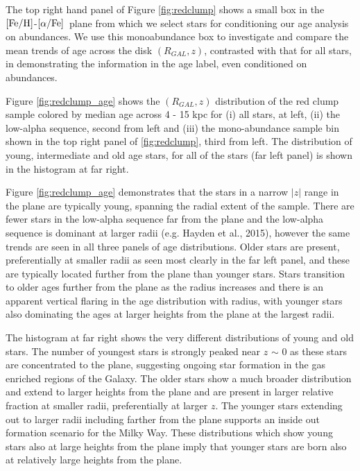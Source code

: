 \documentclass[12pt, preprint]{aastex}
\newcommand{\feh}{\mbox{$\rm [Fe/H]$}}
\newcommand{\alphafe}{\mbox{$\rm [\alpha/Fe]$}}
\begin{document}
The top right hand panel of Figure \ref{fig:redclump} shows a small box in the \feh-\alphafe\ plane from which we select stars for conditioning our age analysis on abundances. We use this monoabundance box to investigate and compare the mean trends of age across the disk $(R_{GAL},z)$, contrasted with that for all stars, in demonstrating the information in the age label, even conditioned on abundances. 


Figure \ref{fig:redclump_age} shows the $(R_{GAL},z)$ distribution of the red clump sample colored by median age across 4 - 15 kpc for  (i) all stars, at left, (ii) the low-alpha sequence, second from left and (iii) the mono-abundance sample bin shown in the top right panel of \ref{fig:redclump}, third from left. The distribution of young, intermediate and old age stars, for all of the stars (far left panel) is shown in the histogram at far right. 

Figure \ref{fig:redclump_age} demonstrates that the stars in a narrow $|z|$ range in the plane are typically young, spanning the radial extent of the sample. There are fewer stars in the low-alpha sequence far from the plane and the low-alpha sequence is dominant at larger radii (e.g. Hayden et al., 2015), however the same trends are seen in all three panels of age distributions. Older stars are present, preferentially at smaller radii as seen most clearly in the far left panel, and these are typically located further from the plane than younger stars. Stars transition to older ages further from the plane as the radius increases and there is an apparent vertical flaring in the age distribution with radius, with younger stars also dominating the ages at larger heights from the plane at the largest radii. 

The histogram at far right shows the very different distributions of young and old stars. The number of youngest stars is strongly peaked near $z$ $\sim$ 0 as these stars are concentrated to the plane, suggesting ongoing star formation in the gas enriched regions of the Galaxy. The older stars show a much broader distribution and extend to larger heights from the plane and are present in larger relative fraction at smaller radii, preferentially at larger $z$.  The younger stars extending out to larger radii including farther from the plane supports an inside out formation scenario for the Milky Way. These distributions which show young stars also at large heights from the plane imply that younger stars are born also at relatively large heights from the plane.
\end{document}
